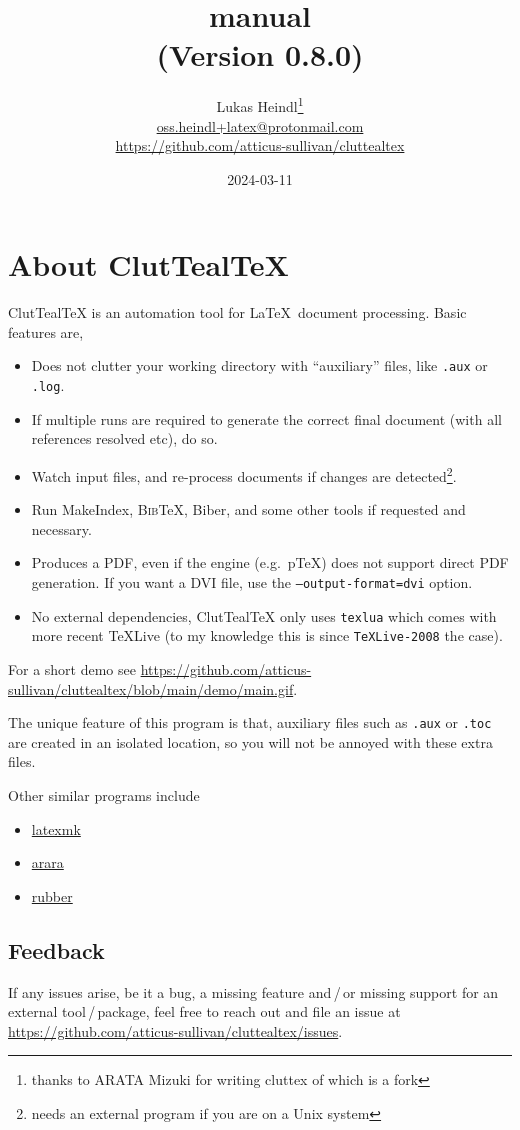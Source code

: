 \documentclass[a4paper, 11pt]{scrartcl}
\title{\CluttealTeX manual\\(Version 0.8.0)} %
\author{%
	Lukas Heindl\thanks{thanks to ARATA Mizuki for writing cluttex of which \CluttealTeX is a fork}\\
	\url{oss.heindl+latex@protonmail.com} \\
	\url{https://github.com/atticus-sullivan/cluttealtex}
}
\date{2024-03-11} %
\let\TeXold\TeX
\newcommand\CluttealTeX{ClutTeal\TeX\xspace}
\providecommand\BibTeX{\textsc{Bib}\TeX\xspace}
\renewcommand\TeX{\TeXold\xspace}
\begin{document}
\maketitle
\tableofcontents

\section{About \CluttealTeX}
\CluttealTeX is an automation tool for \LaTeX\ document processing.
Basic features are,
\begin{itemize}
	\item Does not clutter your working directory with \enquote{auxiliary} files, like \texttt{.aux} or \texttt{.log}.
	\item If multiple runs are required to generate the correct final document (with all references resolved etc), do so.
	\item Watch input files, and re-process documents if changes are detected\footnote{needs an external program if you are on a Unix system}.
	\item Run MakeIndex, \BibTeX, Biber, and some other tools if requested and necessary.
	\item Produces a PDF, even if the engine (e.g.\ p\TeX) does not support direct PDF generation.
		If you want a DVI file, use the \texttt{--output-format=dvi} option.
	\item No external dependencies, \CluttealTeX only uses \texttt{texlua} which comes with more recent TeXLive (to my knowledge this is since \texttt{TeXLive-2008} the case).
\end{itemize}

For a short demo see \url{https://github.com/atticus-sullivan/cluttealtex/blob/main/demo/main.gif}.

The unique feature of this program is that, auxiliary files such as \texttt{.aux} or \texttt{.toc} are created in an isolated location, so you will not be annoyed with these extra files.

Other similar programs include
\begin{itemize}
	\item \href{https://ctan.org/pkg/latexmk/}{latexmk}
	\item \href{https://ctan.org/pkg/arara/}{arara}
	\item \href{https://gitlab.com/latex-rubber/rubber/}{rubber}
\end{itemize}

\subsection{Feedback}
If any issues arise, be it a bug, a missing feature and\,/\,or missing support for an external tool\,/\,package, feel free to reach out and file an issue at \url{https://github.com/atticus-sullivan/cluttealtex/issues}.
\end{document}
